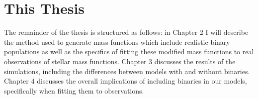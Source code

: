 \section{This Thesis}
The remainder of the thesis is structured as follows: in Chapter 2 I will describe the method used
to generate mass functions which include realistic binary populations as well as the specifics of
fitting these modified mass functions to real observations of stellar mass functions. Chapter 3
discusses the results of the simulations, including the differences between models with and without
binaries. Chapter 4 discusses the overall implications of including binaries in our models,
specifically when fitting them to observations.



